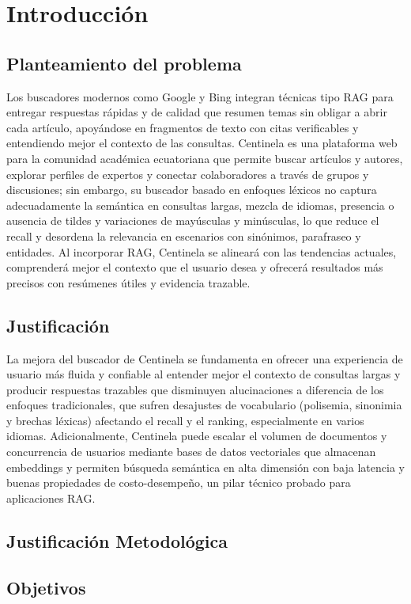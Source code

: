 \chapter{Introducción}

\section{Planteamiento del problema}
Los buscadores modernos como Google y Bing integran técnicas tipo RAG para entregar respuestas rápidas y de calidad que resumen temas
sin obligar a abrir cada artículo, apoyándose en fragmentos de texto con citas verificables y entendiendo mejor el contexto de las consultas. Centinela 
es una plataforma web para la comunidad académica ecuatoriana que permite buscar artículos y autores, explorar perfiles de expertos y conectar colaboradores a través de
 grupos y discusiones; sin embargo, su buscador basado en enfoques léxicos no captura adecuadamente la semántica en consultas largas, mezcla de idiomas, presencia o ausencia
  de tildes y variaciones de mayúsculas y minúsculas, lo que reduce el recall y desordena la relevancia en escenarios con sinónimos, parafraseo y entidades. Al incorporar 
  RAG, Centinela se alineará con las tendencias actuales, comprenderá mejor el contexto que el usuario desea y ofrecerá resultados más precisos con resúmenes útiles y 
  evidencia trazable.
\section{Justificación}
La mejora del buscador de Centinela se fundamenta en ofrecer una experiencia de usuario más fluida y confiable al entender mejor el contexto de consultas largas 
y producir respuestas trazables que disminuyen alucinaciones a diferencia de
 los enfoques tradicionales, que sufren desajustes de vocabulario (polisemia, sinonimia y brechas léxicas) afectando el recall y el ranking, 
 especialmente en varios idiomas.
Adicionalmente, Centinela puede escalar el volumen de documentos y concurrencia de usuarios mediante bases de datos vectoriales que almacenan embeddings y permiten búsqueda semántica en alta dimensión 
  con baja latencia y buenas propiedades de costo-desempeño, un pilar técnico probado para aplicaciones RAG.
\section{Justificación Metodológica}

\section{Objetivos}
